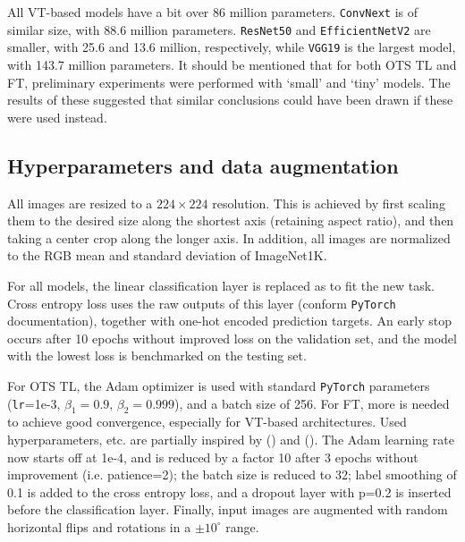 All VT-based models have a bit over 86 million parameters. \texttt{ConvNext} is of similar size, with 88.6 million parameters. \texttt{ResNet50} and \texttt{EfficientNetV2} are smaller, with 25.6 and 13.6 million, respectively, while \texttt{VGG19} is the largest model, with 143.7 million parameters. It should be mentioned that for both OTS TL and FT, preliminary experiments were performed with `small' and `tiny' models. The results of these suggested that similar conclusions could have been drawn if these were used instead.


\subsection{Hyperparameters and data augmentation}
All images are resized to a $224 \times 224$ resolution. This is achieved by first scaling them to the desired size along the shortest axis (retaining aspect ratio), and then taking a center crop along the longer axis. In addition, all images are normalized to the RGB mean and standard deviation of ImageNet1K.

For all models, the linear classification layer is replaced as to fit the new task. Cross entropy loss uses the raw outputs of this layer (conform \texttt{PyTorch} documentation), together with one-hot encoded prediction targets. An early stop occurs after 10 epochs without improved loss on the validation set, and the model with the lowest loss is benchmarked on the testing set.

For OTS TL, the Adam optimizer is used with standard \texttt{PyTorch} parameters (\texttt{lr}=1e-3, $\beta_1=0.9$, $\beta_2=0.999$), and a batch size of 256. For FT, more is needed to achieve good convergence, especially for VT-based architectures. Used hyperparameters, etc. are partially inspired by \citeauthor{matsoukas2021time} (\citeyear{matsoukas2021time}) and \citeauthor{zhou2021convnets} (\citeyear{zhou2021convnets}). The Adam learning rate now starts off at 1e-4, and is reduced by a factor 10 after 3 epochs without improvement (i.e. patience=2); the batch size is reduced to 32; label smoothing of 0.1 is added to the cross entropy loss, and a dropout layer with p=0.2 is inserted before the classification layer. Finally, input images are augmented with random horizontal flips and rotations in a $\pm 10 ^\circ$ range.


